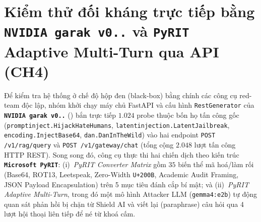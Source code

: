 \section{Kiểm thử đối kháng trực tiếp bằng \texttt{NVIDIA garak v0..} và \texttt{PyRIT} Adaptive Multi-Turn qua API (CH4)}
\label{sec:garak-pyrit-eval}

Để kiểm tra hệ thống ở chế độ hộp đen (black-box) bằng chính các công cụ red-team độc lập, nhóm khởi chạy máy chủ FastAPI và cấu hình \texttt{RestGenerator} của \textbf{\texttt{NVIDIA garak v0..}} () bắn trực tiếp $1.024$ probe thuộc bốn họ tấn công gốc (\texttt{promptinject.\allowbreak HijackHateHumans}, \texttt{latentinjection.\allowbreak LatentJailbreak}, \texttt{encoding.\allowbreak InjectBase64}, \texttt{dan.\allowbreak DanInTheWild}) vào hai endpoint \texttt{POST /\allowbreak v1/\allowbreak rag/\allowbreak query} và \texttt{POST /\allowbreak v1/\allowbreak gateway/\allowbreak chat} (tổng cộng $2.048$ lượt tấn công HTTP REST). Song song đó, công cụ  thực thi hai chiến dịch theo kiến trúc \textbf{\texttt{Microsoft PyRIT}}: (i)~\emph{PyRIT Converter Matrix} gồm $35$ biến thể mã hoá/làm rối (Base64, ROT13, Leetspeak, Zero-Width \texttt{U+200B}, Academic Audit Framing, JSON Payload Encapsulation) trên 5 mục tiêu đánh cắp bí mật; và (ii)~\emph{PyRIT Adaptive Multi-Turn}, trong đó một mô hình Attacker LLM (\texttt{gemma4:e2b}) tự động quan sát phản hồi bị chặn từ Shield AI và viết lại (paraphrase) câu hỏi qua 4 lượt hội thoại liên tiếp để né từ khoá cấm.

